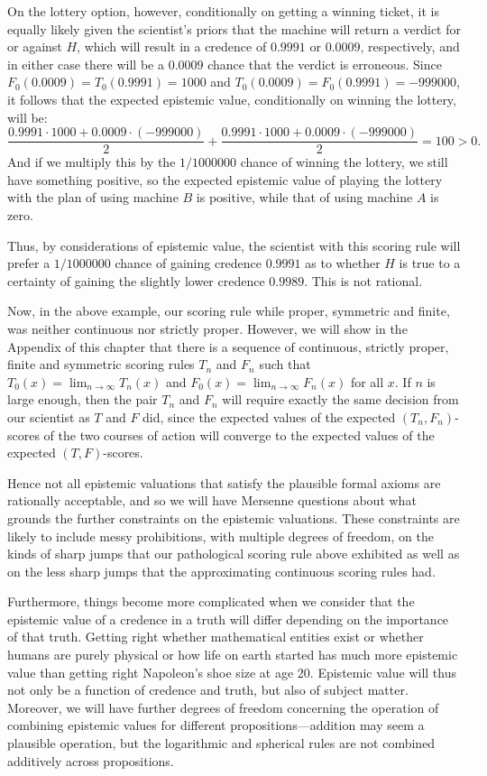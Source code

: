 On the lottery option, however, conditionally on getting a winning ticket, it is equally likely given the 
scientist's priors that the machine will return a verdict for or against $H$, which will result in a credence 
of $0.9991$ or $0.0009$, respectively, and in either case there will be a $0.0009$
chance that the verdict is erroneous. Since $F_0(0.0009)=T_0(0.9991)=1000$ and $T_0(0.0009)=F_0(0.9991)=-999000$, it follows 
that the expected epistemic value, conditionally on winning the lottery, will be:
$$
    \frac{0.9991 \cdot 1000+0.0009\cdot (-999000)}2+\frac{0.9991 \cdot 1000+0.0009\cdot (-999000)}2 = 100 > 0.
$$
And if we multiply this by the $1/1000000$ chance of winning the lottery, we still have something positive, so
the expected epistemic value of playing the lottery with the plan of using machine $B$ is positive, while that of
using machine $A$ is zero. 

Thus, by considerations of epistemic value, the scientist with this scoring rule will prefer a $1/1000000$ chance of 
gaining credence $0.9991$ as to whether $H$ is true to a certainty of gaining the slightly lower credence $0.9989$.
This is not rational. 

Now, in the above example, our scoring rule while proper, symmetric and finite, was neither continuous nor strictly proper. 
However, we will show in the Appendix of this chapter that there is a sequence of continuous, strictly proper, finite and symmetric
scoring rules $T_n$ and $F_n$ such that $T_0(x)=\lim_{n\to\infty} T_n(x)$ and $F_0(x)=\lim_{n\to\infty} F_n(x)$ for all $x$.
If $n$ is large enough, then the pair $T_n$ and $F_n$ will require exactly the same decision from our scientist as 
$T$ and $F$ did, since the expected values of the expected $(T_n,F_n)$-scores of the two courses of action will converge
to the expected values of the expected $(T,F)$-scores.

Hence not all epistemic valuations that satisfy the plausible formal axioms are rationally acceptable, and so we 
will have Mersenne questions about what grounds the further constraints on the epistemic valuations. These constraints
are likely to include messy prohibitions, with multiple degrees of freedom, on the kinds of sharp jumps that our
pathological scoring rule above exhibited as well as on the less sharp jumps that the approximating continuous
scoring rules had.

Furthermore, things become more complicated when we consider that the epistemic value of a credence in a truth will
differ depending on the importance of that truth. Getting right whether mathematical entities exist or whether humans are 
purely physical or how life on earth started has much more epistemic value than getting right Napoleon's shoe size at age 20. Epistemic
value will thus not only be a function of credence and truth, but also of subject matter. Moreover, we will have 
further degrees of freedom concerning the operation of combining epistemic values for different propositions---addition
may seem a plausible operation, but the logarithmic and spherical rules are not combined additively across propositions.

